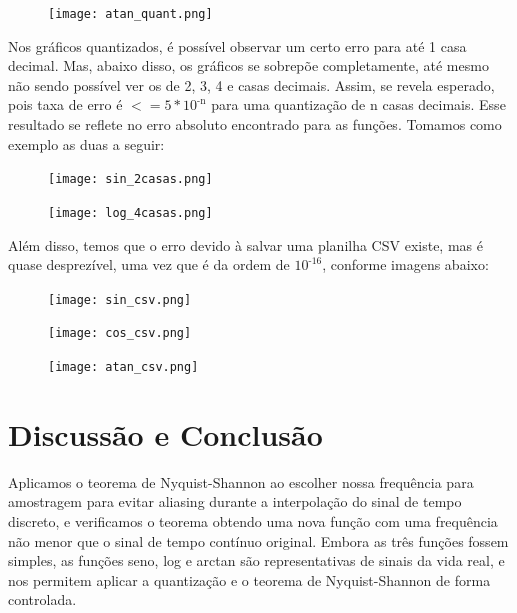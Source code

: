\documentclass[12pt]{article}
\begin{document}
\begin{figure}[h]
    \centering
    \texttt{[image: atan\_quant.png]}
    \label{fig:enter-label}
\end{figure}

Nos gráficos quantizados, é possível observar um certo erro para até 1 casa decimal. Mas, abaixo disso, os gráficos se sobrepõe completamente, até mesmo não sendo possível ver os de 2, 3, 4 e casas decimais. Assim, se revela esperado, pois taxa de erro é $<= 5 * 10^\text{-n}$ para uma quantização de n casas decimais. Esse resultado se reflete no erro absoluto encontrado para as funções. Tomamos como exemplo as duas a seguir:

\clearpage

\begin{figure}[h]
    \centering
    \texttt{[image: sin\_2casas.png]}
    \label{fig:enter-label}
\end{figure}

\begin{figure}[h]
    \centering
    \texttt{[image: log\_4casas.png]}
    \label{fig:enter-label}
\end{figure}

Além disso, temos que o erro devido à salvar uma planilha CSV existe, mas é quase desprezível, uma vez que é da ordem de $10^\text{-16}$, conforme imagens abaixo:


\begin{figure}[h]
    \centering
    \texttt{[image: sin\_csv.png]}
    \label{fig:enter-label}
\end{figure}

\begin{figure}[h]
    \centering
    \texttt{[image: cos\_csv.png]}
    \label{fig:enter-label}
\end{figure}

\begin{figure}[h]
    \centering
    \texttt{[image: atan\_csv.png]}
    \label{fig:enter-label}
\end{figure}

\clearpage

\section{Discussão e Conclusão}
Aplicamos o teorema de Nyquist-Shannon ao escolher nossa frequência para amostragem para evitar aliasing durante a interpolação do sinal de tempo discreto, e verificamos o teorema obtendo uma nova função com uma frequência não menor que o sinal de tempo contínuo original.
Embora as três funções fossem simples, as funções seno, log e arctan são representativas de sinais da vida real, e nos permitem aplicar a quantização e o teorema de Nyquist-Shannon de forma controlada.
\end{document}
